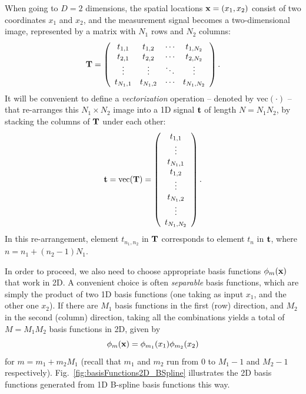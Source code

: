 \documentclass[10pt,twoside]{book}
\begin{document}
When going to $D=2$ dimensions, the spatial locations $\mathbf{x} = (x_1, x_2)$ consist of two coordinates $x_1$ and $x_2$, and the measurement signal becomes a two-dimensional image, represented by a matrix with $N_1$ rows and $N_2$ columns:
$$
\mathbf{T} = 
\left(
\begin{array}{cccc}
t_{1,1} & t_{1,2} & \cdots & t_{1,N_2} \\ 
t_{2,1} & t_{2,2} & \cdots & t_{2,N_2} \\ 
\vdots & \vdots & \ddots & \vdots \\ 
t_{N_1,1} & t_{N_1,2} & \cdots & t_{N_1,N_2} \\ 
\end{array}
\right)
.
$$
It will be convenient to define a \emph{vectorization} 
operation 
-- denoted by $\mathrm{vec}(\cdot)$ --
that re-arranges this $N_1 \times N_2$ image into a 1D signal $\mathbf{t}$ of length $N = N_1 N_2$, by stacking the columns of $\mathbf{T}$ under each other:
\begin{equation}
\mathbf{t} = 
\mathrm{vec}( \mathbf{T} )
=
\left(
\begin{array}{c}
t_{1,1} \\
\vdots \\
t_{N_1,1} \\
t_{1,2} \\
\vdots \\
t_{N_1,2} \\
\vdots \\
t_{N_1,N_2}
\end{array}
\right)
.
\label{eq:vec}
\end{equation}
In this re-arrangement, element $t_{{n_1},{n_2}}$ in $\mathbf{T}$ corresponds to element $t_n$ in $\mathbf{t}$, where $n = n_1 + (n_2-1) N_1$.

%
In order to proceed, we also need to choose appropriate basis functions 
$\phi_m(\mathbf{x})$ that work in 2D. A convenient choice is often \emph{separable} basis functions, which are simply the product of two 1D basis functions (one taking as input $x_1$, and the other one $x_2$). If there are $M_1$ basis functions in the first (row) direction, and $M_2$ in the second (column) direction, 
taking all the combinations yields 
a total of $M = M_1 M_2$ basis functions in 2D, given by
\begin{equation}
\phi_m( \mathbf{x} ) = \phi_{m_1}( x_1 ) \phi_{m_2}( x_2 ) 
\label{eq:basisFunction2D}
\end{equation}
for $m = m_1 + m_2 M_1$ (recall that $m_1$ and $m_2$ run from $0$ to $M_1-1$ and $M_2-1$ respectively).
%
Fig.~\ref{fig:basisFunctions2D_BSpline} illustrates the 2D basis functions generated from 1D 
B-spline basis functions this way.
\end{document}
